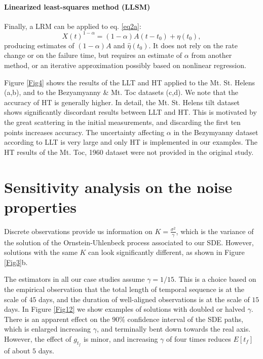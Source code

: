\documentclass{article}
\begin{document}
\paragraph{Linearized least-squares method (LLSM)}
Finally, a LRM can be applied to eq. \ref{eq2a}:
$$X(t)^{1-\alpha}=(1-\alpha)A(t-t_0)+\eta(t_0),$$
producing estimates of $(1-\alpha)A$ and $\hat\eta(t_0)$. It does not rely on the rate change or on the failure time, but requires an estimate of $\alpha$ from another method, or an iterative approximation possibly based on nonlinear regression.

Figure \ref{Fig4} shows the results of the LLT and HT applied to the Mt. St. Helens (a,b), and to the Bezyamyanny \& Mt. Toc datasets (c,d). We note that the accuracy of HT is generally higher. In detail, the Mt. St. Helens tilt dataset shows significantly discordant results between LLT and HT. This is motivated by the great scattering in the initial measurements, and discarding the first ten points increases accuracy. The uncertainty affecting $\alpha$ in the Bezymyanny dataset according to LLT is very large and only HT is implemented in our examples. The HT results of the Mt. Toc, 1960 dataset were not provided in the original study.

\section{Sensitivity analysis on the noise properties}\label{A-2}
Discrete observations provide us information on $K=\frac{\sigma^2}{\gamma}$, which is the variance of the solution of the Ornstein-Uhlenbeck process associated to our SDE. However, solutions with the same $K$ can look significantly different, as shown in Figure \ref{Fig3}b.

The estimators in all our case studies assume $\gamma=1/15$.  This is a choice based on the empirical observation that the total length of temporal sequence is at the scale of $45$ days, and the duration of well-aligned observations is at the scale of $15$ days. In Figure \ref{Fig12} we show examples of solutions with doubled or halved $\gamma$. There is an apparent effect on the $90\%$ confidence interval of the SDE paths, which is enlarged increasing $\gamma$, and terminally bent down towards the real axis. However, the effect of $g_{t_f}$ is minor, and increasing $\gamma$ of four times reduces $E[t_f]$ of about $5$ days.
\end{document}
